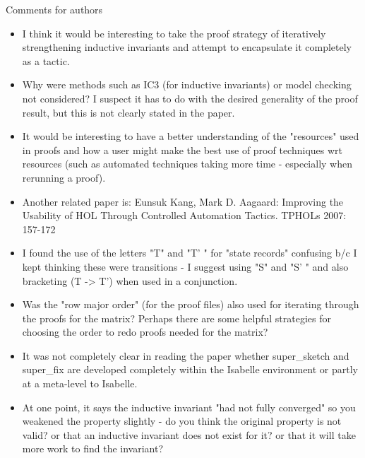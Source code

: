 \documentclass[10pt,conference]{IEEEtran}
\begin{document}
Comments for authors
\begin{itemize}
    \item I think it would be interesting to take the proof strategy of iteratively strengthening inductive invariants and attempt to encapsulate it completely as a tactic. 
    \item Why were methods such as IC3 (for inductive invariants) or model checking not considered? I suspect it has to do with the desired generality of the proof result, but this is not clearly stated in the paper. 
    \item 
    It would be interesting to have a better understanding of the "resources" used in proofs and how a user might make the best use of proof techniques wrt resources (such as automated techniques taking more time - especially when rerunning a proof).
    \item 
    Another related paper is: Eunsuk Kang, Mark D. Aagaard: Improving the Usability of HOL Through Controlled Automation Tactics. TPHOLs 2007: 157-172
    \item I found the use of the letters "T" and "T' " for "state records" confusing b/c I kept thinking these were transitions - I suggest using "S" and "S' " and also bracketing (T -> T') when used in a conjunction. 
    \item Was the "row major order" (for the proof files) also used for iterating through the proofs for the matrix? Perhaps there are some helpful strategies for choosing the order to redo proofs needed for the matrix?
    \item It was not completely clear in reading the paper whether super\_sketch and super\_fix are developed completely within the Isabelle environment or partly at a meta-level to Isabelle.
    \item At one point, it says the inductive invariant "had not fully converged" so you weakened the property slightly - do you think the original property is not valid? or that an inductive invariant does not exist for it? or that it will take more work to find the invariant?
\end{itemize}
\end{document}
